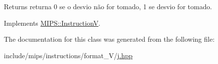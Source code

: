 \begin{DoxyReturn}{Returns}
returna 0 se o desvio não for tomado, 1 se desvio for tomado. 
\end{DoxyReturn}


Implements \hyperlink{classMIPS_1_1InstructionV_a511d8ba098bcca95f1e91ff6616470ef}{M\+I\+P\+S\+::\+InstructionV}.



The documentation for this class was generated from the following file\+:\begin{DoxyCompactItemize}
\item 
include/mips/instructions/format\+\_\+\+V/\hyperlink{j_8hpp}{j.\+hpp}\end{DoxyCompactItemize}

